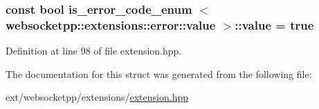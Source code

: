 \subsubsection[{value}]{\setlength{\rightskip}{0pt plus 5cm}const bool is\+\_\+error\+\_\+code\+\_\+enum    $<$ {\bf websocketpp\+::extensions\+::error\+::value} $>$\+::value = true\hspace{0.3cm}{\ttfamily [static]}}\label{structis__error__code__enum_01_01_01_01_3_01websocketpp_1_1extensions_1_1error_1_1value_01_4_a035870062b1c893460f245bb070efc5e}


Definition at line 98 of file extension.\+hpp.



The documentation for this struct was generated from the following file\+:\begin{DoxyCompactItemize}
\item 
ext/websocketpp/extensions/\hyperlink{extension_8hpp}{extension.\+hpp}\end{DoxyCompactItemize}
